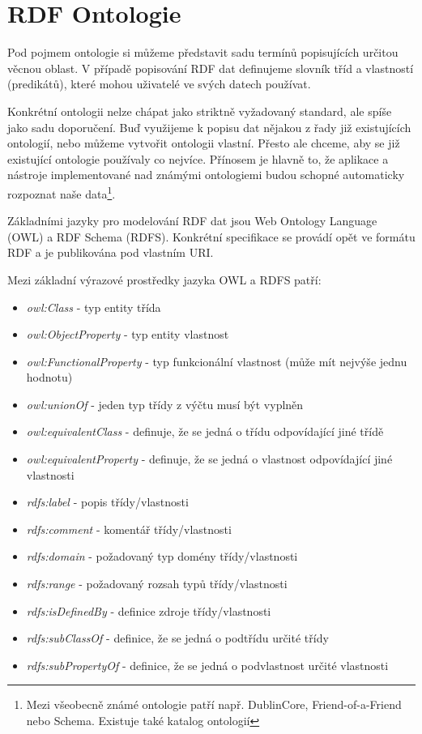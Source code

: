\newpage

\section{RDF Ontologie}

Pod pojmem ontologie si můžeme představit sadu termínů popisujících určitou věcnou oblast. V případě popisování RDF dat definujeme slovník tříd a vlastností (predikátů), které mohou uživatelé ve svých datech používat.

Konkrétní ontologii nelze chápat jako striktně vyžadovaný standard, ale spíše jako sadu doporučení. Buď využijeme k popisu dat nějakou z řady již existujících ontologií, nebo můžeme vytvořit ontologii vlastní. Přesto ale chceme, aby se již existující ontologie používaly co nejvíce. Přínosem je hlavně to, že aplikace a nástroje implementované nad známými ontologiemi budou schopné automaticky rozpoznat naše data\footnote{Mezi všeobecně známé ontologie patří např. DublinCore\cite{dc}, Friend-of-a-Friend\cite{foaf} nebo Schema\cite{schema}. Existuje také katalog ontologií\cite{lov}}. 

Základními jazyky pro modelování RDF dat jsou Web Ontology Language (OWL)\cite{OWL} a RDF Schema (RDFS)\cite{RdfSchema}. Konkrétní specifikace se provádí opět ve formátu RDF a je publikována pod vlastním URI.

Mezi základní výrazové prostředky jazyka OWL a RDFS patří:

\begin{itemize}
\item \textit{owl:Class} - typ entity třída
\item \textit{owl:ObjectProperty} - typ entity vlastnost
\item \textit{owl:FunctionalProperty} - typ funkcionální vlastnost (může mít nejvýše jednu hodnotu)
\item \textit{owl:unionOf} - jeden typ třídy z výčtu musí být vyplněn 
\item \textit{owl:equivalentClass} - definuje, že se jedná o třídu odpovídající jiné třídě
\item \textit{owl:equivalentProperty} - definuje, že se jedná o vlastnost odpovídající jiné vlastnosti
\item \textit{rdfs:label} - popis třídy/vlastnosti
\item \textit{rdfs:comment} - komentář třídy/vlastnosti
\item \textit{rdfs:domain} - požadovaný  typ domény třídy/vlastnosti
\item \textit{rdfs:range} - požadovaný rozsah typů třídy/vlastnosti
\item \textit{rdfs:isDefinedBy} - definice zdroje třídy/vlastnosti
\item \textit{rdfs:subClassOf} - definice, že se jedná o podtřídu určité třídy  
\item \textit{rdfs:subPropertyOf} - definice, že se jedná o podvlastnost určité vlastnosti  
\end{itemize}

